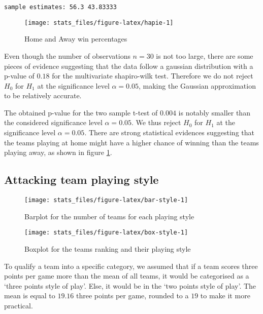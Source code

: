 \documentclass[
  12pt,
]{article}
\begin{document}
\begin{verbatim}
sample estimates: 56.3 43.83333
\end{verbatim}

\begin{figure}

{\centering \texttt{[image: stats\_files/figure-latex/hapie-1]} 

}

\caption{Home and Away win percentages}\label{fig:hapie}
\end{figure}

Even though the number of observations \(n=30\) is not too large, there are some pieces of evidence suggesting that the data follow a gaussian distribution with a p-value of \(0.18\) for the multivariate shapiro-wilk test. Therefore we do not reject \(H_{0}\) for \(H_{1}\) at the significance level \(\alpha=0.05\), making the Gaussian approximation to be relatively accurate.

The obtained p-value for the two sample t-test of \(0.004\) is notably smaller than the considered significance level \(\alpha=0.05\). We thus reject \(H_{0}\) for \(H_{1}\) at the significance level \(\alpha=0.05\). There are strong statistical evidences suggesting that the teams playing at home might have a higher chance of winning than the teams playing away, as shown in figure \ref{fig:hapie}.

\hypertarget{sec:PlayingStyle}{%
\subsection{Attacking team playing style}\label{sec:PlayingStyle}}

\begin{figure}
\texttt{[image: stats\_files/figure-latex/bar-style-1]} \caption{Barplot for the number of teams for each playing style}\label{fig:bar-style}
\end{figure}

\begin{figure}
\texttt{[image: stats\_files/figure-latex/box-style-1]} \caption{Boxplot for the teams ranking and their playing style}\label{fig:box-style}
\end{figure}

To qualify a team into a specific category, we assumed that if a team scores three points per game more than the mean of all teams, it would be categorised as a `three points style of play'. Else, it would be in the `two points style of play'. The mean is equal to \(19.16\) three points per game, rounded to a \(19\) to make it more practical.
\end{document}

